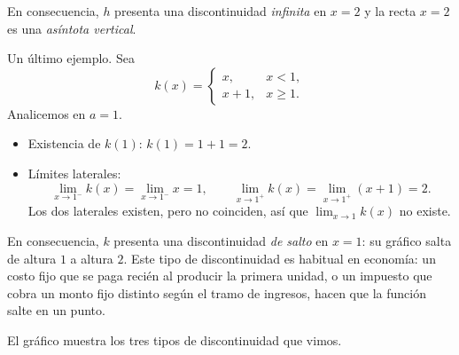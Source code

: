 \documentclass{article}
\begin{document}
En consecuencia, {\color{teal}\(h\) presenta una discontinuidad \emph{infinita} en \(x=2\)} y la recta \(x=2\) es una \emph{asíntota vertical}.

\medskip
Un último ejemplo. Sea
\[
k(x)=
\begin{cases}
x, & x<1,\\[4pt]
x+1, & x\ge 1.
\end{cases}
\]
Analicemos en \(a=1\).

\begin{itemize}
  \item {\color{teal}Existencia de \(k(1)\):} \(k(1)=1+1=2\).
  \item {\color{teal}Límites laterales:}
  \[
    \lim_{x\to 1^-}k(x)=\lim_{x\to 1^-}x=1,
    \qquad
    \lim_{x\to 1^+}k(x)=\lim_{x\to 1^+}(x+1)=2.
  \]
  Los dos laterales existen, pero no coinciden, así que \(\displaystyle \lim_{x\to 1}k(x)\) no existe.
\end{itemize}

En consecuencia, {\color{teal}\(k\) presenta una discontinuidad \emph{de salto} en \(x=1\)}: su gráfico salta de altura \(1\) a altura \(2\). Este tipo de discontinuidad es habitual en economía: un costo fijo que se paga recién al producir la primera unidad, o un impuesto que cobra un monto fijo distinto según el tramo de ingresos, hacen que la función salte en un punto.

El gráfico muestra los tres tipos de discontinuidad que vimos.
\end{document}
